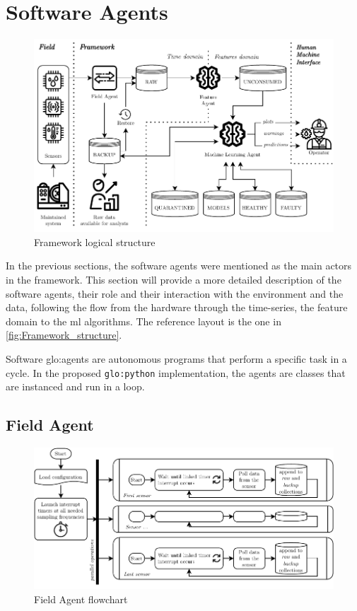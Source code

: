 \section{Software Agents}
\label{sec:agents}

\begin{figure}
    \centering
    \includegraphics[width=\textwidth]{images/Framework/Framework_structure.pdf}
    \caption{Framework logical structure}
    \label{fig:Framework_structure}
\end{figure}

In the previous sections, the software agents were mentioned as the main actors in the framework. This section will provide a more detailed description of the software agents, their role and their interaction with the environment and the data, following the flow from the hardware through the time-series, the feature domain to the \gls{ml} algorithms. The reference layout is the one in \autoref{fig:Framework_structure}. 

Software \gls{glo:agent}s are autonomous programs that perform a specific task in a cycle. In the proposed \texttt{\gls{glo:python}} implementation, the agents are classes that are instanced and run in a loop.

\subsection{Field Agent}
\label{subsec:FieldAgent}
\begin{figure}
    \centering
    \includegraphics[scale=1]{images/Framework/Field_Agent_flowchart.pdf}
    \caption{Field Agent flowchart}
    \label{fig:Field_Agent_flowchart}
\end{figure}

